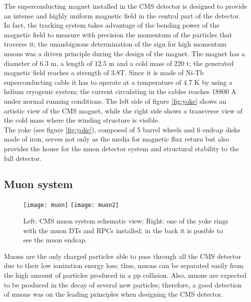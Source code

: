 \noindent The superconducting magnet installed in the CMS detector is designed to provide an intense and highly uniform magnetic field in the central part of the detector. In fact, the tracking system takes advantage of the bending power of the magnetic field to measure with precision the momentum of the particles that traverse it; the unambiguous determination of the sign for high momentum muons was a driven principle during the design of the magnet. The magnet has a diameter of 6.3 m, a length of 12.5 m and a cold mass of 220 t; the generated magnetic field reaches a strength of 3.8T. Since it is made of Ni-Tb superconducting cable it has to operate at a temperature of 4.7 K by using a helium cryogenic system; the current circulating in the cables reaches 18800 A under normal running conditions. The left side of figure \ref{fig:yoke} shows an artistic view of the CMS magnet, while the right side shows a transverse view of the cold mass where the winding structure is visible. \\

\noindent The yoke (see figure \ref{fig:yoke}), composed of 5 barrel wheels and 6 endcap disks made of iron, serves not only as the media for magnetic flux return but also provides the house for the muon detector system and structural stability to the full detector.     

\subsection{Muon system }

\begin{figure}[h!]
  \centering
  \texttt{[image: muon]}
  \texttt{[image: muon2]}
  \caption[CMS Muon system schematic view]{Left: CMS muon system schematic view; Right: one of the yoke rings with the muon DTs and RPCs installed; in the back it is posible to see the muon endcap\cite{muon}. }
  \label{fig:muon_chambers}
\end{figure}

\noindent Muons are the only charged particles able to pass through all the CMS detector due to their low ionization energy loss; thus, muons can be separated easily from the high amount of particles produced in a pp collision. Also, muons are expected to be produced in the decay of several new particles; therefore, a good detection of muons was on the leading principles when designing the CMS detector.\\

